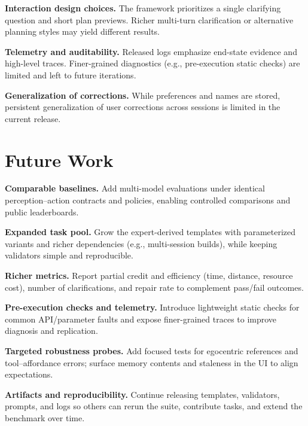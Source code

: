 \textbf{Interaction design choices.} The framework prioritizes a single clarifying question and short plan previews. Richer multi-turn clarification or alternative planning styles may yield different results.

\textbf{Telemetry and auditability.} Released logs emphasize end-state evidence and high-level traces. Finer-grained diagnostics (e.g., pre-execution static checks) are limited and left to future iterations.

\textbf{Generalization of corrections.} While preferences and names are stored, persistent generalization of user corrections across sessions is limited in the current release.

\section{Future Work}

\textbf{Comparable baselines.} Add multi-model evaluations under identical perception–action contracts and policies, enabling controlled comparisons and public leaderboards.

\textbf{Expanded task pool.} Grow the expert-derived templates with parameterized variants and richer dependencies (e.g., multi-session builds), while keeping validators simple and reproducible.

\textbf{Richer metrics.} Report partial credit and efficiency (time, distance, resource cost), number of clarifications, and repair rate to complement pass/fail outcomes.

\textbf{Pre-execution checks and telemetry.} Introduce lightweight static checks for common API/parameter faults and expose finer-grained traces to improve diagnosis and replication.

\textbf{Targeted robustness probes.} Add focused tests for egocentric references and tool–affordance errors; surface memory contents and staleness in the UI to align expectations.

\textbf{Artifacts and reproducibility.} Continue releasing templates, validators, prompts, and logs so others can rerun the suite, contribute tasks, and extend the benchmark over time.
